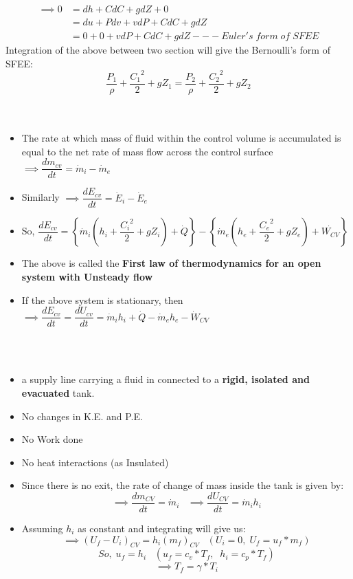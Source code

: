\documentclass[8pt]{article}
\begin{document}
\begin{align*}
	\implies 0 &= dh + CdC + gdZ + 0\\
	&=du + Pdv + vdP + CdC + gdZ\\
	&=0 + 0 + \boxed{vdP + CdC + gdZ} --- Euler's\;form\;of\;SFEE
\end{align*}
Integration of the above between two section will give the Bernoulli's form of SFEE:
$$\boxed{\dfrac{P_1}{\rho} + \dfrac{{C_1}^2}{2} + gZ_1 = \dfrac{P_2}{\rho} + \dfrac{{C_2}^2}{2} + gZ_2}$$
\hrulefill\\
\\
	\begin{itemize}
		\item The rate at which mass of fluid within the control volume is accumulated is equal to the net rate of mass flow across the control surface $\implies \dfrac{dm_{cv}}{dt} = \dot{m}_i - \dot{m}_e$
		\item Similarly $\implies \dfrac{dE_{cv}}{dt} = \dot{E}_i - \dot{E}_e$
		\item So, $\boxed{\dfrac{dE_{cv}}{dt} = \left\{\dot{m}_i  \left(h_i + \dfrac{{C_i}^2}{2} + gZ_i \right) + \dot{Q} \right\} - \left\{\dot{m}_e\left(h_e + \dfrac{{C_e}^2}{2} + gZ_e\right) + \dot{W_{CV}} \right\}  }$
		\item The above is called the \textbf{First law of thermodynamics for an open system with Unsteady flow}
		\item If the above system is stationary, then $\implies\boxed{\dfrac{dE_{cv}}{dt} = \dfrac{dU_{cv}}{dt} = \dot{m}_ih_i + \dot{Q} - \dot{m}_eh_e - \dot{W}_{CV}}$
	\end{itemize}
	\hrulefill\\
\\
	\begin{itemize}
		\item a supply line carrying a fluid in connected to a \textbf{rigid, isolated and evacuated} tank.
		\item No changes in K.E. and P.E. 
		\item No Work done
		\item No heat interactions (as Insulated)
		\item Since there is no exit, the rate of change of mass inside the tank is given by:
		$$\implies \dfrac{dm_{CV}}{dt} = \dot{m}_i \;\;\; \implies \dfrac{dU_{CV}}{dt} = \dot{m}_ih_i$$
		\item Assuming $h_i$ as constant and integrating will give us:
		$$\implies (U_f - U_i)_{CV} = h_i(m_f)_{CV}\;\;\;(U_i = 0,\;U_f = u_f * m_f)$$
		$$So,\;\boxed{u_f = h_i}\;\;\;(u_f = c_v*T_f,\;\;h_i=c_p*T_f)$$
		$$\implies \boxed{T_f = \gamma*T_i}$$
	\end{itemize}
\end{document}
